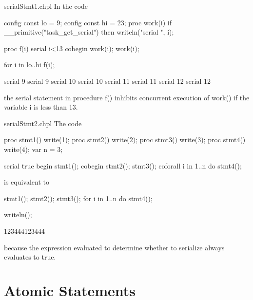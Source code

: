 \begin{chapelexample}{serialStmt1.chpl}
In the code
\begin{chapelpre}
config const lo = 9;
config const hi = 23;
proc work(i) {
  if \_\_primitive("task\_get\_serial") then
    writeln("serial ", i);
}
\end{chapelpre}
\begin{chapel}
proc f(i) {
  serial i<13 {
    cobegin {
      work(i);
      work(i);
    }
  }
}

for i in lo..hi {
  f(i);
}
\end{chapel}
\begin{chapelpost}
\end{chapelpost}
\begin{chapeloutput}
serial 9
serial 9
serial 10
serial 10
serial 11
serial 11
serial 12
serial 12
\end{chapeloutput}
the serial statement in procedure f() inhibits concurrent execution of
work() if the variable i is less than 13.
\end{chapelexample}

\begin{chapelexample}{serialStmt2.chpl}
The code
\begin{chapelpre}
proc stmt1() { write(1); }
proc stmt2() { write(2); }
proc stmt3() { write(3); }
proc stmt4() { write(4); }
var n = 3;
\end{chapelpre}
\begin{chapel}
serial true {
  begin stmt1();
  cobegin {
    stmt2();
    stmt3();
  }
  coforall i in 1..n do stmt4();
}
\end{chapel}
is equivalent to
\begin{chapel}
stmt1();
{
  stmt2();
  stmt3();
}
for i in 1..n do stmt4();
\end{chapel}
\begin{chapelpost}
writeln();
\end{chapelpost}
\begin{chapeloutput}
123444123444
\end{chapeloutput}
because the expression evaluated to determine whether to serialize
always evaluates to true.
\end{chapelexample}

\section{Atomic Statements}
\label{Atomic_Transactions}
\label{atomicity}

